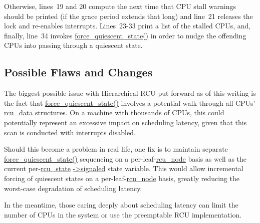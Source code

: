 Otherwise, lines~19 and 20 compute the next time that CPU stall warnings
should be printed (if the grace period extends that long) and
line~21 releases the lock and re-enables interrupts.
Lines~23-33 print a list of the stalled CPUs, and, finally,
line~34 invokes \url{force_quiescent_state()} in order to nudge the
offending CPUs into passing through a quiescent state.

\subsection{Possible Flaws and Changes}
\label{app:rcuimpl:rcutreewt:Possible Flaws and Changes}

The biggest possible issue with Hierarchical RCU put forward as of this
writing is the fact that \url{force_quiescent_state()} involves a
potential walk through all CPUs' \url{rcu_data} structures.
On a machine with thousands of CPUs, this could potentially represent
an excessive impact on scheduling latency, given that this scan is
conducted with interrupts disabled.

Should this become a problem in real life, one fix is to maintain
separate \url{force_quiescent_state()} sequencing on a
per-leaf-\url{rcu_node} basis as well as the current per-\url{rcu_state}
\url{->signaled} state variable.
This would allow incremental forcing of quiescent states on a
per-leaf-\url{rcu_node} basis, greatly reducing the worst-case degradation
of scheduling latency.

In the meantime, those caring deeply about scheduling latency can
limit the number of CPUs in the system or use the preemptable RCU
implementation.
